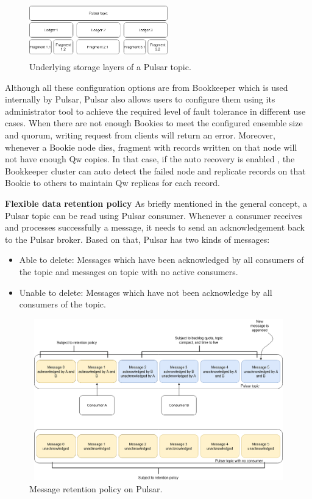 \begin{figure}[h]
	\centering
	\includegraphics[width=6cm,height=2.5cm]{images/pulsar-topic.png}
	\caption{Underlying storage layers of a Pulsar topic.}
	\label{fig:pulsartopic}
\end{figure}
Although all these configuration options are from Bookkeeper which is used internally by Pulsar, Pulsar also allows users to configure them using its administrator tool to achieve the required level of fault tolerance in different use cases. When there are not enough Bookies to meet the configured ensemble size and quorum, writing request from clients will return an error. Moreover, whenever a Bookie node dies, fragment with records written on that node will not have enough Qw copies. In that case, if the auto recovery is enabled \cite{bookkeeperautoreco}, the Bookkeeper cluster can auto detect the failed node and replicate records on that Bookie to others to maintain Qw replicas for each record.  

\textbf{Flexible data retention policy}
As briefly mentioned in the general concept, a Pulsar topic can be read using Pulsar consumer. Whenever a consumer receives and processes successfully a message, it needs to send an acknowledgement back to the Pulsar broker. Based on that, Pulsar has two kinds of messages:
\begin{itemize}
	\item Able to delete: Messages which have been acknowledged by all consumers of the topic and messages on topic with no active consumers.
	\item Unable to delete: Messages which have not been acknowledge by all consumers of the topic.
\end{itemize}

\begin{figure}[h]
	\centering
	\includegraphics[width=12cm,height=7cm]{images/pulsar-retention.png}
	\caption{Message retention policy on Pulsar.}
	\label{fig:pulsarretention}
\end{figure}

